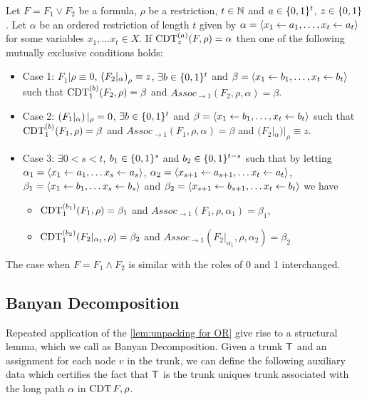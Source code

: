 \begin{lemma}
\label{lem:unpacking for OR}
    Let $F = F_1 \lor F_2$ be a \demorgan formula, $\rho$ be a restriction, $t \in \mathbb{N}$ and $a \in \{0,1\}^t$, $z \in \{0,1\}$. Let $\alpha$ be an ordered restriction of length $t$ given by $\alpha = \left\langle x_1 \gets a_1, \dots, x_t \gets a_t \right\rangle$ for some variables $x_1, \dots x_t \in X$.
    If $\operatorname{CDT}^{(a)}_z(F, \rho) = \alpha$ then one of the following mutually exclusive conditions holds:
    \begin{itemize}
        \item Case 1: $F_1|\rho \equiv 0$,
        $\left( F_2|_{\alpha} \right)_\rho \equiv z$,  
        $\exists b \in \{0,1\}^t$ and $\beta = \left\langle x_1 \gets b_1, \dots , x_t \gets b_t \right\rangle$ such that $\operatorname{CDT}^{(b)}_1(F_2,\rho) = \beta$ and $Assoc_{\to 1}(F_2,\rho,\alpha) = \beta$. 
        \item Case 2: $\left( F_1|_\alpha \right)|_{\rho} = 0$, $\exists b \in \{0,1\}^t$ and $\beta = \left\langle x_1 \gets b_1, \dots , x_t \gets b_t \right\rangle$ such that $\operatorname{CDT}^{(b)}_1(F_1,\rho) = \beta$ and $Assoc_{\to 1}(F_1, \rho , \alpha) = \beta$ and $(F_2|_\alpha)|_{\rho} \equiv z$. 
        \item Case 3: $\exists 0< s < t$, $b_1 \in \{0,1\}^s$ and $b_2 \in \{0,1\}^{t-s}$ such that by letting $\alpha_1 = \left\langle x_1 \gets a_1, \dots x_s \gets a_s \right\rangle$, $\alpha_2 = \left\langle x_{s+1} \gets a_{s+1}, \dots x_t \gets a_t \right\rangle$, $\beta_1= \left\langle x_1 \gets b_1, \dots x_s \gets b_s  \right\rangle$ and $\beta_2 = \left\langle x_{s+1} \gets b_{s+1}, \dots x_t \gets b_t \right\rangle$ we have
        \begin{itemize}
            \item $\operatorname{CDT}^{(b_1)}_1(F_1,\rho) = \beta_1$ and $Assoc_{\to 1}(F_1,\rho,\alpha_1)=\beta_1$,
            \item $\operatorname{CDT}^{(b_2)}_1(F_2|_{\alpha_1},\rho) = \beta_2$ and $Assoc_{\to 1}(F_2|_{\alpha_1},\rho,\alpha_2)=\beta_2$
        \end{itemize}
    \end{itemize}
\end{lemma}
The case when $F  = F_1 \land F_2$ is similar with the roles of 0 and 1 interchanged.

\subsection{Banyan Decomposition}
Repeated application of the \cref{lem:unpacking for OR} give rise to a structural lemma, which we call as Banyan Decomposition. Given a trunk $\mathsf{T}$ and an assignment for each node $v$ in the trunk, we can define the following auxiliary  data which certifies the fact that $\mathsf{T}$ is the trunk uniques trunk associated with the long path $\alpha$ in $\operatorname{CDT}{F,\rho}$.

